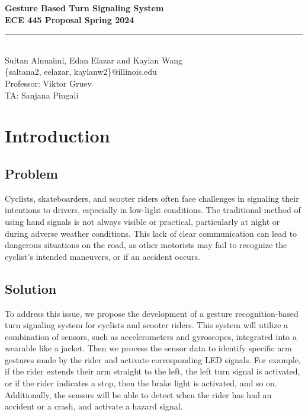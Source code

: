 \documentclass[12pt]{article}
\begin{document}
\begin{titlepage}
\centering
{}
{\LARGE\textbf{Gesture Based Turn Signaling System }}\\[1cm] 
{\large\textbf{ECE 445 Proposal Spring 2024}}\\[0.3cm]
\rule{\textwidth}{1pt}\\
{\Large Sultan Alnuaimi, Edan Elazar and Kaylan Wang}\\[0.5cm] 
{\small \{saltana2, eelazar, kaylanw2\}@illinois.edu}\\[0.5cm] 
{\small Professor: Viktor Gruev}\\[0.5cm]
{\small TA: Sanjana Pingali}\\[1cm]

\end{titlepage} 

\tableofcontents 
\newpage
\section{Introduction}
\subsection{Problem}
Cyclists, skateboarders, and scooter riders often face 
challenges in signaling their intentions to drivers, 
especially in low-light conditions. The traditional
 method of using hand signals is not always visible or 
 practical, particularly at night or during adverse weather 
 conditions. This lack of clear communication can lead to 
 dangerous situations on the road, as other motorists may 
 fail to recognize the cyclist's intended maneuvers, or if 
 an accident occurs. 

\subsection{Solution}

To address this issue, we propose the development of a gesture 
recognition-based turn signaling system for cyclists and scooter 
riders. This system will utilize a combination of sensors, such 
as accelerometers and gyroscopes, integrated into a wearable 
like a jacket. Then we process the sensor data to identify 
specific arm gestures made by the rider and activate corresponding 
LED signals. For example, if the rider extends their arm straight 
to the left, the left turn signal is activated, or if the rider 
indicates a stop, then the brake light is activated, and so on. 
Additionally, the sensors will be able to detect when the rider 
has had an accident or a crash, and activate a hazard signal. 
\end{document}

